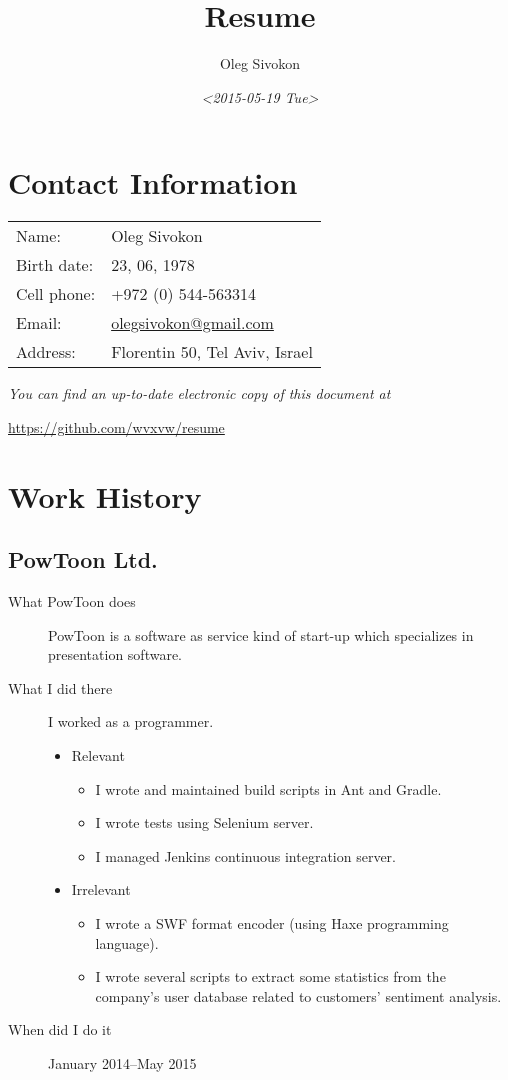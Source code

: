 \documentclass[11pt]{article}
\author{Oleg Sivokon}
\date{\textit{<2015-05-19 Tue>}}
\title{Resume}
\begin{document}
\maketitle

\section{Contact Information}
\label{sec:orgheadline1}
\begin{center}
\begin{tabular}{ll}
Name: & Oleg Sivokon\\
Birth date: & 23, 06, 1978\\
Cell phone: & +972 (0) 544-563314\\
Email: & \href{mailto:olegsivokon@gmail.com}{olegsivokon@gmail.com}\\
Address: & Florentin 50, Tel Aviv, Israel\\
\end{tabular}
\end{center}

\emph{You can find an up-to-date electronic copy of this document at}

\url{https://github.com/wvxvw/resume}

\clearpage

\section{Work History}
\label{sec:orgheadline6}

\subsection{PowToon Ltd.}
\label{sec:orgheadline2}
\begin{description}
\item[{What PowToon does}] PowToon is a software as service kind of start-up
which specializes in presentation software.
\item[{What I did there}] I worked as a programmer.
\begin{itemize}
\item Relevant
\begin{itemize}
\item I wrote and maintained build scripts in Ant and Gradle.
\item I wrote tests using Selenium server.
\item I managed Jenkins continuous integration server.
\end{itemize}
\item Irrelevant
\begin{itemize}
\item I wrote a SWF format encoder (using Haxe programming language).
\item I wrote several scripts to extract some statistics from the company's
user database related to customers' sentiment analysis.
\end{itemize}
\end{itemize}

\item[{When did I do it}] January 2014--May 2015
\end{description}
\end{document}
